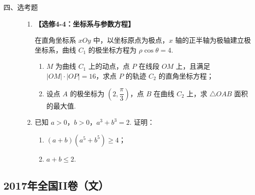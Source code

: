 \begin{description}

    \item[四、选考题]

    \begin{enumerate}[leftmargin=5pt]

      \addtocounter{enumi}{+21}

        \item \textbf{【选修4-4：坐标系与参数方程】}

在直角坐标系 \(xOy\) 中，以坐标原点为极点，\(x\) 轴的正半轴为极轴建立极坐标系，曲线 \(C_1\) 的极坐标方程为 \(\rho\cos\theta=4\).

\begin{enumerate}
\item \(M\) 为曲线 \(C_1\) 上的动点，点 \(P\) 在线段 \(OM\) 上，且满足 \(|OM|\cdot|OP|=16\)，求点 \(P\) 的轨迹 \(C_2\) 的直角坐标方程；
\item 设点 \(A\) 的极坐标为 \(\left(2,\dfrac{\pi}{3}\right)\)，点 \(B\) 在曲线 \(C_2\) 上，求 \(\triangle OAB\) 面积的最大值.
\end{enumerate}

        \item 已知 \(a>0\)，\(b>0\)，\(a^3+b^3=2\). 证明：

\begin{enumerate}
\item \((a+b)(a^5+b^5)\ge 4\)；
\item \(a+b\le 2\).
\end{enumerate}

    \end{enumerate}

\end{description}


\subsection{2017年全国II卷（文）}\label{gk:2017年全国II卷（文）}


